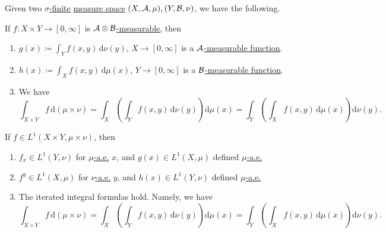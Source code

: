 \begin{theorem}\label{thm:Fubini-Tonelli-theorem}
	Given two \hyperref[def:finite-measure]{\(\sigma \)-finite} \hyperref[def:measure-space]{measure space} \((X, \mathcal{\MakeUppercase{a}} , \mu ), (Y, \mathcal{\MakeUppercase{b}} , \nu )\),
	we have the following.

	\begin{theorem*}\label{thm:Tonelli-theorem}
		If \(f\colon X\times Y\to [0, \infty ]\) is \hyperref[def:A-measurable-function]{\(\mathcal{\MakeUppercase{a}} \otimes \mathcal{\MakeUppercase{b}} \)-measurable},
		then
		\begin{enumerate}[(1)]
			\item \(g(x)\coloneqq \int_Y f(x, y)\,\mathrm{d} \nu (y)\), \(X\to [0, \infty ]\) is a \hyperref[def:A-measurable-function]{\(\mathcal{\MakeUppercase{a}}\)-measurable function}.
			\item \(h(x)\coloneqq \int_X f(x, y)\,\mathrm{d} \mu (x)\), \(Y\to [0, \infty ]\) is a \hyperref[def:A-measurable-function]{\(\mathcal{\MakeUppercase{b}}\)-measurable function}.
			\item We have
			      \[
				      \int_{X\times Y} f \,\mathrm{d}(\mu \times \nu ) = \int _X\left(\int _Y f(x, y)\,\mathrm{d}\nu (y)\right)\mathrm{d} \mu (x) = \int _Y\left(\int_X f(x, y)\,\mathrm{d} \mu (x)\right)\mathrm{d} \nu (y).
			      \]
		\end{enumerate}
	\end{theorem*}

	\begin{theorem*}\label{thm:Fubini-theorem}
		If \(f\in L^1(X\times Y, \mu \times \nu )\), then
		\begin{enumerate}[(1)]
			\item \(f_{x} \in L^1(Y, \nu )\) for \hyperref[def:mu-almost-everywhere]{\(\mu\)-a.e.} \(x\), and \(g(x)\in L^1(X, \mu )\) defined \hyperref[def:mu-almost-everywhere]{\(\mu\)-a.e.}
			\item \(f^{y} \in L^1(X, \mu )\) for \hyperref[def:mu-almost-everywhere]{\(\nu\)-a.e.} \(y\), and \(h(x)\in L^1(Y, \nu )\) defined \hyperref[def:mu-almost-everywhere]{\(\mu\)-a.e.}
			\item The iterated integral formulas hold. Namely, we have
			      \[
				      \int_{X\times Y} f \,\mathrm{d}(\mu \times \nu ) = \int _X\left(\int _Y f(x, y)\,\mathrm{d}\nu (y)\right)\mathrm{d} \mu (x) = \int _Y\left(\int_X f(x, y)\,\mathrm{d} \mu (x)\right)\mathrm{d} \nu (y).
			      \]
		\end{enumerate}
	\end{theorem*}
\end{theorem}
